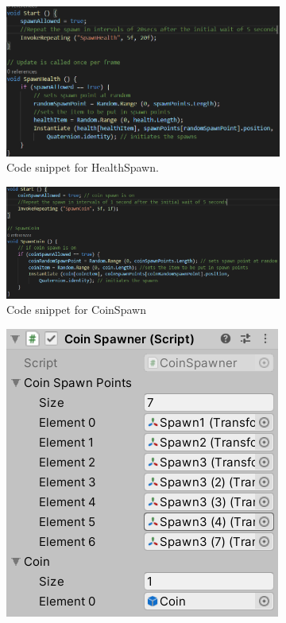   \begin{figure}[h]
  \begin{subfigure}{1\textwidth}
\centering
  \includegraphics[width= 1\linewidth]{Images/HealthSpawn.PNG}
  \caption{Code snippet for HealthSpawn.}
  \label{fig:HealthSpawn}
  \end{subfigure}
  \begin{subfigure}{1\textwidth}
\centering
  \includegraphics[width = 1\linewidth]{Images/CoinSpawn.PNG}
  \caption{Code snippet for CoinSpawn}
  \label{fig:CoinSpawn}
  \end{subfigure}
  \begin{subfigure}{.5\textwidth}
\centering
  \includegraphics[width = 1\linewidth]{Images/CoinSpawnInspector.PNG}

\end{subfigure}
\end{figure}
